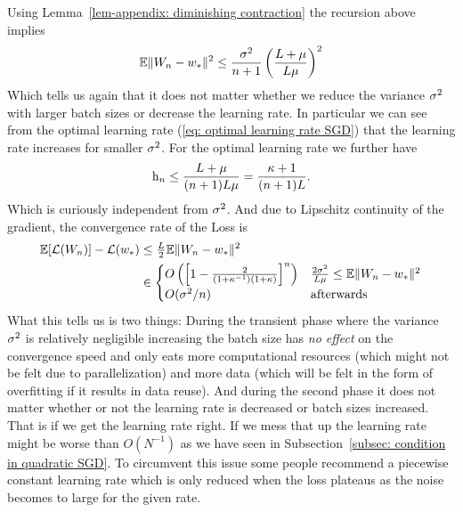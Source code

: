 Using Lemma~\ref{lem-appendix: diminishing contraction} the recursion above
implies
\begin{align*}
	\mathbb{E}\|W_n - w_*\|^2
	\le \frac{\sigma^2}{n+1} \left(\frac{L+\mu}{L\mu}\right)^2
\end{align*}
Which tells us again that it does not matter whether we reduce the variance
\(\sigma^2\) with larger batch sizes or decrease the learning rate. In
particular we can see from the optimal learning rate (\ref{eq: optimal learning rate SGD})
that the learning rate increases for smaller \(\sigma^2\). For the 
optimal learning rate we further have
\begin{align*}
	\text{h}_n \le \frac{L+\mu}{(n+1)L\mu} = \frac{\kappa + 1}{(n+1)L}.
\end{align*}
Which is curiously independent from \(\sigma^2\).
And due to Lipschitz continuity of the gradient, the convergence rate of the Loss is
\begin{align*}
	\mathbb{E}[\mathcal{L}(W_n)]- \mathcal{L}(w_*)
	&\le \tfrac{L}{2}\mathbb{E}\|W_n-w_*\|^2\\
	&\in \begin{cases}
		O\left(\left[1-\frac{2}{(1+\kappa^{-1})(1+\kappa)}\right]^n\right)
		& \frac{2\sigma^2}{L\mu} \le \mathbb{E}\|W_n - w_*\|^2\\
		O(\sigma^2/n) & \text{afterwards}
	\end{cases}
\end{align*}
What this tells us is two things: During the transient phase where the variance
\(\sigma^2\) is relatively negligible increasing the batch size has \emph{no
effect} on the convergence speed and only eats more computational resources
(which might not be felt due to parallelization) and more data (which will be
felt in the form of overfitting if it results in data reuse). And during the
second phase it does not matter whether or not the learning rate is decreased
or batch sizes increased. That is if we get the learning rate right. If we mess
that up the learning rate might be worse than \(O(N^{-1})\) as we have seen
in Subsection~\ref{subsec: condition in quadratic SGD}. To circumvent this issue
some people recommend a piecewise constant learning rate which is only reduced
when the loss plateaus as the noise becomes to large for the given rate.

